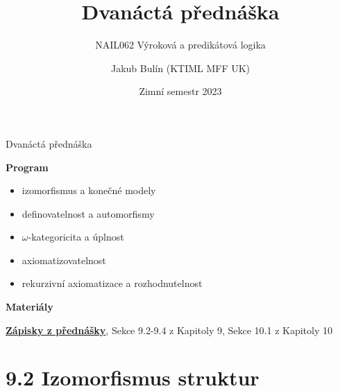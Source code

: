 \documentclass{beamer}
\title{Dvanáctá přednáška}
\subtitle{NAIL062 Výroková a predikátová logika}
\author{Jakub Bulín (KTIML MFF UK)}
\date{Zimní semestr 2023}
\begin{document}
\frame{\titlepage}


\begin{frame}{Dvanáctá přednáška}

    \textbf{Program}
        \begin{itemize}
            \item izomorfismus a konečné modely
            \item definovatelnost a automorfismy
            \item $\omega$-kategoricita a úplnost
            \item axiomatizovatelnost
            \item rekurzivní axiomatizace a rozhodnutelnost
        \end{itemize}

    \textbf{Materiály}

        \href{https://github.com/jbulin-mff-uk/nail062/raw/main/lecture/lecture-notes/lecture-notes.pdf}{\alert{\textbf{Zápisky z přednášky}}}, Sekce 9.2-9.4 z Kapitoly 9, Sekce 10.1 z Kapitoly 10

\end{frame}


\section{9.2 Izomorfismus struktur}
\end{document}
